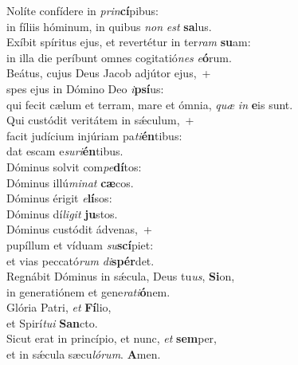 \evenverse Nolíte confídere in \textit{prin}\textbf{cí}pibus:~\*\\
\evenverse in fíliis hóminum, in quibus \textit{non} \textit{est} \textbf{sa}lus.\\
\oddverse Exíbit spíritus ejus, et revertétur in ter\textit{ram} \textbf{su}am:~\*\\
\oddverse in illa die períbunt omnes cogitatió\textit{nes} \textit{e}\textbf{ó}rum.\\
\evenverse Beátus, cujus Deus Jacob adjútor ejus,~+\\
\evenverse  spes ejus in Dómino Deo \textit{i}\textbf{psí}us:~\*\\
\evenverse qui fecit cælum et terram, mare et ómnia, \textit{quæ} \textit{in} \textbf{e}is sunt.\\
\oddverse Qui custódit veritátem in sǽculum,~+\\
\oddverse  facit judícium injúriam pa\textit{ti}\textbf{én}tibus:~\*\\
\oddverse dat escam e\textit{su}\textit{ri}\textbf{én}tibus.\\
\evenverse Dóminus solvit com\textit{pe}\textbf{dí}tos:~\*\\
\evenverse Dóminus illú\textit{mi}\textit{nat} \textbf{cæ}cos.\\
\oddverse Dóminus érigit \textit{e}\textbf{lí}sos:~\*\\
\oddverse Dóminus dí\textit{li}\textit{git} \textbf{ju}stos.\\
\evenverse Dóminus custódit ádvenas,~+\\
\evenverse  pupíllum et víduam \textit{su}\textbf{scí}piet:~\*\\
\evenverse et vias peccató\textit{rum} \textit{di}\textbf{spér}det.\\
\oddverse Regnábit Dóminus in sǽcula, Deus tu\textit{us}, \textbf{Si}on,~\*\\
\oddverse in generatiónem et gene\textit{ra}\textit{ti}\textbf{ó}nem.\\
\evenverse Glória Patri, \textit{et} \textbf{Fí}lio,~\*\\
\evenverse et Spirí\textit{tu}\textit{i} \textbf{San}cto.\\
\oddverse Sicut erat in princípio, et nunc, \textit{et} \textbf{sem}per,~\*\\
\oddverse et in sǽcula sæcu\textit{ló}\textit{rum}. \textbf{A}men.\\

